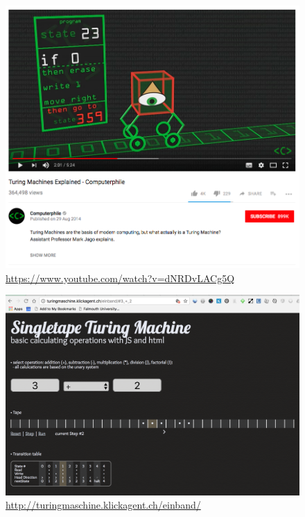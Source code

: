 \begin{frame}

	\begin{figure}
		\includegraphics[scale=0.2]{assets/compute.png}
		\caption{\href{https://www.youtube.com/watch?v=dNRDvLACg5Q}{https://www.youtube.com/watch?v=dNRDvLACg5Q}}
	\end{figure}
\end{frame}

\begin{frame}
	\begin{figure}
		\includegraphics[scale=0.2]{assets/interactive.png}
		\caption{\href{http://turingmaschine.klickagent.ch/einband/}{http://turingmaschine.klickagent.ch/einband/}}
	\end{figure}
\end{frame}

